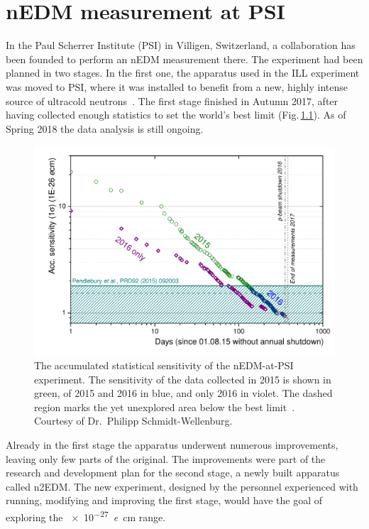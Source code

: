 \chapter{nEDM measurement at PSI}
\label{ch:nedm-at-psi-apparatus}

In the Paul Scherrer Institute (PSI) in Villigen, Switzerland, a collaboration has been founded to perform an nEDM measurement there. The experiment had been planned in two stages. In the first one, the apparatus used in the ILL experiment was moved to PSI, where it was installed to benefit from a new, highly intense source of ultracold neutrons~\cite{Lauss2014}. The first stage finished in Autumn 2017, after having collected enough statistics to set the world's best limit (Fig.\,\ref{fig:nEDM_accumulated_sensitivity}). As of Spring 2018 the data analysis is still ongoing.

\begin{figure}
  \centering
  \includegraphics[width=\linewidth]{gfx/nEDMatPSI/accumulated_sensitivity.pdf}
  \caption{The accumulated statistical sensitivity of the nEDM-at-PSI experiment. The sensitivity of the data collected in 2015 is shown in green, of 2015 and 2016 in blue, and only 2016 in violet. The dashed region marks the yet unexplored area below the best limit~\cite{Pendlebury2015}. Courtesy of Dr.\ Philipp Schmidt-Wellenburg.}\label{fig:nEDM_accumulated_sensitivity}
\end{figure}

Already in the first stage the apparatus underwent numerous improvements, leaving only few parts of the original. The improvements were part of the research and development plan for the second stage, a newly built apparatus called n2EDM\@. The new experiment, designed by the personnel experienced with running, modifying and improving the first stage, would have the goal of exploring the \SI{e-27}{\elementarycharge\centi\meter} range.


